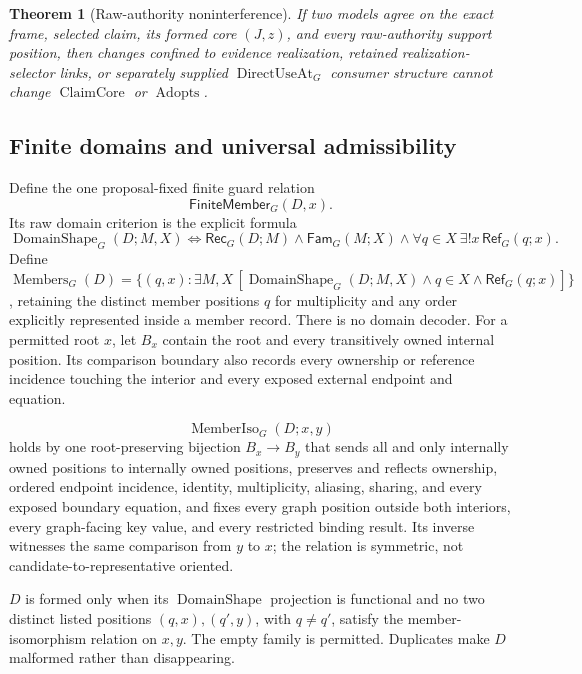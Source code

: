 \documentclass[11pt,twoside]{article}
\newcommand{\FiniteMember}{\mathsf{FiniteMember}}
\newcommand{\Rec}{\mathsf{Rec}}
\newcommand{\Fam}{\mathsf{Fam}}
\newcommand{\RefPos}{\mathsf{Ref}}
\newtheorem{theorem}{Theorem}
\begin{document}
\begin{theorem}[Raw-authority noninterference]\label{thm:raw-authority}
If two models agree on the exact frame, selected claim, its formed core
\((J,z)\), and every raw-authority support position, then changes confined to
evidence realization, retained realization-selector links, or separately supplied
\(\operatorname{DirectUseAt}_G\) consumer structure cannot change
\(\operatorname{ClaimCore}\) or \(\operatorname{Adopts}\).
\end{theorem}

\subsection{Finite domains and universal admissibility}\label{sec:admissibility}

Define the one proposal-fixed finite guard relation
\[
  \FiniteMember_G(D,x).
\]
Its raw domain criterion is the explicit formula
\[
 \operatorname{DomainShape}_G(D;M,X)
 \Longleftrightarrow
 \Rec_G(D;M)\land\Fam_G(M;X)\land
 \forall q\in X\ \exists!x\,\RefPos_G(q;x).
\]
Define
\(\operatorname{Members}_G(D)=
  \{(q,x):\exists M,X\,[\operatorname{DomainShape}_G(D;M,X)
       \land q\in X\land\RefPos_G(q;x)]\}\), retaining the distinct member
positions \(q\) for multiplicity and any order explicitly represented inside a
member record.  There is no domain decoder.  For a permitted root \(x\), let
\(B_x\) contain
the root and every transitively owned internal position.  Its comparison boundary
also records every ownership or reference incidence touching the interior and
every exposed external endpoint and equation.

\[
  \operatorname{MemberIso}_G(D;x,y)
\]
holds by one root-preserving bijection \(B_x\to B_y\) that sends all and only
internally owned positions to internally owned positions, preserves and reflects
ownership, ordered endpoint incidence, identity, multiplicity, aliasing, sharing,
and every exposed boundary equation, and fixes every graph position outside both
interiors, every graph-facing key value, and every restricted binding result.  Its
inverse witnesses the same comparison from \(y\) to \(x\); the relation is
symmetric, not candidate-to-representative oriented.

\(D\) is formed only when its \(\operatorname{DomainShape}\) projection is
functional and no two distinct listed positions \((q,x),(q',y)\), with
\(q\ne q'\), satisfy the member-isomorphism relation on \(x,y\).  The empty
family is permitted.
Duplicates make \(D\) malformed rather than disappearing.
\end{document}
